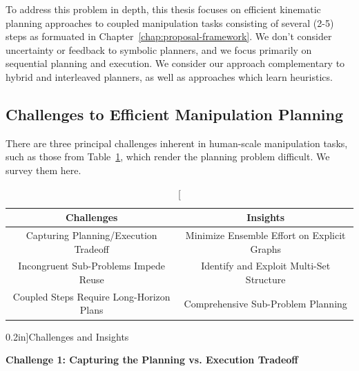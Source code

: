 To address this problem in depth,
this thesis focuses on
efficient kinematic planning approaches
to coupled manipulation tasks consisting of several (2-5) steps
as formuated in Chapter~\ref{chap:proposal-framework}.
We don't consider uncertainty
or feedback to symbolic planners,
and we focus primarily on sequential planning and execution.
We consider our approach complementary to
hybrid and interleaved planners,
as well as approaches which learn heuristics.

\subsection*{Challenges to Efficient Manipulation Planning}

There are three principal challenges inherent in
human-scale manipulation tasks,
such as those from Table~\ref{tab:challenges-insights},
which render the planning problem difficult.
We survey them here.

\begin{table}[t]
   \centering
   \begin{tabular}{cc}
      \toprule
      Challenges & Insights \\
      \midrule
      Capturing Planning/Execution Tradeoff
         & Minimize Ensemble Effort on Explicit Graphs \\
      Incongruent Sub-Problems Impede Reuse
         & Identify and Exploit Multi-Set Structure \\
      Coupled Steps Require Long-Horizon Plans
         & Comprehensive Sub-Problem Planning \\
      \bottomrule
   \end{tabular}
   \caption[][0.2in]{Challenges and Insights}
   \label{tab:challenges-insights}
\end{table}

\vspace{0.1in}
\noindent
\textbf{Challenge 1:
   Capturing the Planning vs. Execution Tradeoff}

